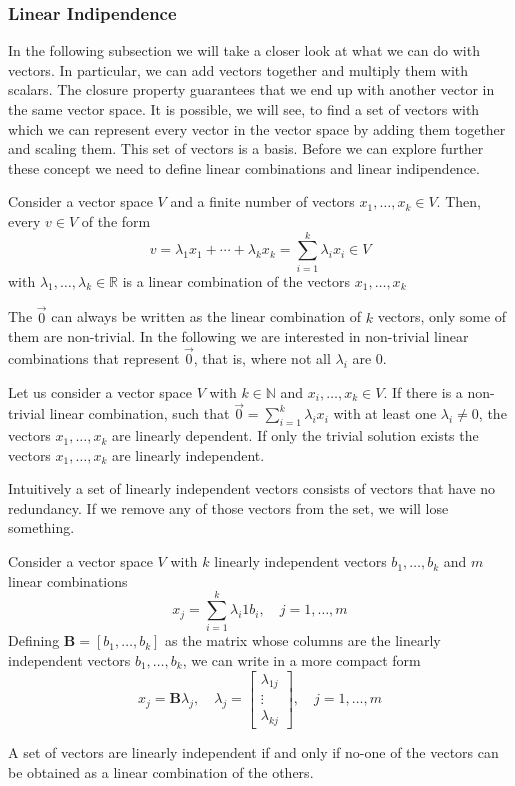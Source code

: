 \subsubsection*{Linear Indipendence}
In the following subsection we will take a closer look at what we can do with vectors. In particular, we can add vectors together and multiply them with scalars. The closure property guarantees that we end up with another vector in the same vector space. It is possible, we will see, to find a set of vectors with which we can represent every vector in the vector space by adding them together and scaling them. This set of vectors is a basis. Before we can explore further these concept we need to define linear combinations and linear indipendence.

\begin{definition}
    Consider a vector space $V$ and a finite number of vectors $x_1,\ldots, x_k \in V$. Then, every $v \in V$ of the form
    \[
        v = \lambda_1x_1 + \cdots + \lambda_kx_k = \sum_{i=1}^{k}{\lambda_ix_i} \in V
    \] 
    with $\lambda_1,\ldots,\lambda_k \in \mathbb{R}$ is a linear combination of the vectors $x_1,\ldots, x_k$
\end{definition}
The $\vec{0}$ can always be written as the linear combination of $k$ vectors, only some of them are non-trivial. In the following we are interested in non-trivial linear combinations that represent $\vec{0}$, that is, where not all $\lambda_i$ are 0.
\begin{definition}
    Let us consider a vector space $V$ with $k \in \mathbb{N}$ and $x_i, \ldots, x_k \in V$. If there is a non-trivial linear combination, such that $\vec{0} = \sum_{i=1}^{k}{\lambda_ix_i}$ with at least one $\lambda_i \neq 0$, the vectors $x_1,\ldots, x_k$ are linearly dependent. If only the trivial solution exists the vectors $x_1, \ldots, x_k$ are linearly independent.
\end{definition}
Intuitively a set of linearly independent vectors consists of vectors that have no redundancy. If we remove any of those vectors from the set, we will lose something.
\begin{remark}
    Consider a vector space $V$ with $k$ linearly independent vectors $b_1,\ldots,b_k$ and $m$ linear combinations
    \[
        x_j = \sum_{i=1}^{k}{\lambda_i1b_i}, \quad j= 1,\ldots, m
    \]
    Defining $\mathbf{B} = [b_1,\ldots,b_k]$ as the matrix whose columns are the linearly independent vectors $b_1,\ldots,b_k$, we can write in a more compact form
    \[
        x_j = \mathbf{B}\lambda_j, \quad \lambda_j = \begin{bmatrix}
            \lambda_{1j}\\ \vdots \\ \lambda_{kj}
        \end{bmatrix}, \quad j = 1,\ldots, m
    \]
\end{remark}
A set of vectors are linearly independent if and only if no-one of the vectors can be obtained as a linear combination of the others.\\
